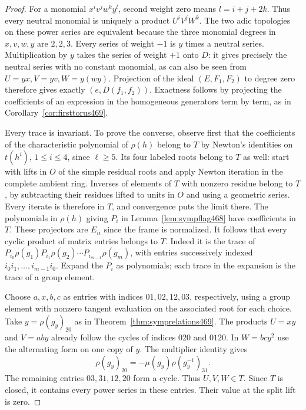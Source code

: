 \documentclass[a4paper,11pt]{article}
\theoremstyle{definition}
\theoremstyle{remark}
\numberwithin{equation}{section}
\begin{document}
\begin{proof}
For a monomial \(x^iv^jw^ky^l\), second weight zero means
\(l=i+j+2k\). Thus every neutral monomial is uniquely a product
\(U^iV^jW^k\). The two adic topologies on these power series are
equivalent because the three monomial degrees in \(x,v,w,y\)
are \(2,2,3\). Every series of weight \(-1\) is \(y\) times a
neutral series. Multiplication by \(y\) takes the series of weight
\(+1\) onto \(D\): it gives precisely the neutral series with no
constant monomial, as can also be seen from \(U=yx,V=yv,W=y(wy)\).
Projection of the ideal \((E,F_1,F_2)\) to degree zero therefore
gives exactly \((e,D(f_1,f_2))\). Exactness follows by projecting
the coefficients of an expression in the homogeneous generators
term by term, as in Corollary~\ref{cor:firsttorus469}.

Every trace is invariant. To prove the converse, observe first
that the coefficients of the characteristic polynomial of \(\rho(h)\)
belong to \(T\) by Newton's identities on \(t(h^i)\), \(1\le i\le4\),
since \(\ell\ge5\). Its four labeled roots belong to \(T\) as well:
start with lifts in \(O\) of the simple residual roots and apply
Newton iteration in the complete ambient ring. Inverses of elements
of \(T\) with nonzero residue belong to \(T\), by subtracting their
residues lifted to units in \(O\) and using a geometric series.
Every iterate is therefore in \(T\), and convergence puts the limit
there. The polynomials in \(\rho(h)\) giving \(P_i\) in
Lemma~\ref{lem:sympflag468} have coefficients in \(T\). These
projectors are \(E_{ii}\) since the frame is normalized. It follows
that every cyclic product of matrix entries belongs to \(T\).
Indeed it is the trace of
\(P_{i_0}\rho(g_1)P_{i_1}\rho(g_2)\cdots P_{i_{m-1}}\rho(g_m)\),
with entries successively indexed \(i_0i_1,\ldots,i_{m-1}i_0\).
Expand the \(P_i\) as polynomials; each trace in the expansion is
the trace of a group element.

Choose \(a,x,b,c\) as entries with indices \(01,02,12,03\),
respectively, using a group element with nonzero tangent evaluation
on the associated root for each choice. Take \(y=\rho(g_y)_{20}\)
as in Theorem~\ref{thm:symprelations469}. The products \(U=xy\)
and \(V=aby\) already follow the cycles of indices \(020\) and
\(0120\). In \(W=bcy^2\) use the alternating form on one copy
of \(y\). The multiplier identity gives
\[
          \rho(g_y)_{20}=-\mu(g_y)\rho(g_y^{-1})_{31}.
\]
The remaining entries \(03,31,12,20\) form a cycle. Thus
\(U,V,W\in T\). Since \(T\) is closed, it contains every power
series in these entries. Their value at the split lift is zero.
\end{proof}
\end{document}
